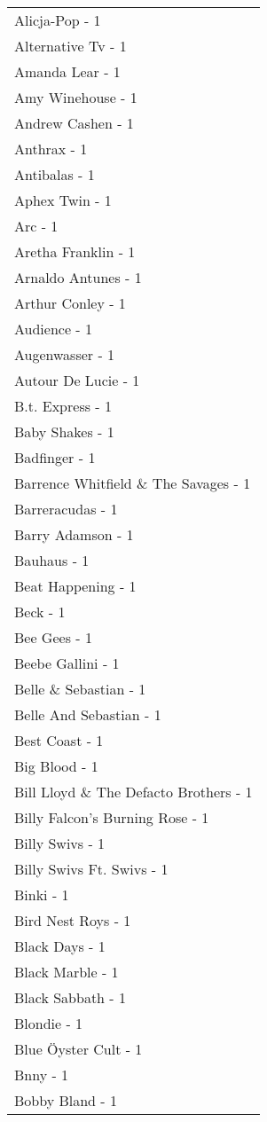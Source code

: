 \documentclass[
]{article}
\begin{document}
\begin{longtable}{l}
Alicja-Pop - 1 \\ 
Alternative Tv - 1 \\ 
Amanda Lear - 1 \\ 
Amy Winehouse - 1 \\ 
Andrew Cashen - 1 \\ 
Anthrax - 1 \\ 
Antibalas - 1 \\ 
Aphex Twin - 1 \\ 
Arc - 1 \\ 
Aretha Franklin - 1 \\ 
Arnaldo Antunes - 1 \\ 
Arthur Conley - 1 \\ 
Audience - 1 \\ 
Augenwasser - 1 \\ 
Autour De Lucie - 1 \\ 
B.t. Express - 1 \\ 
Baby Shakes - 1 \\ 
Badfinger - 1 \\ 
Barrence Whitfield \& The Savages - 1 \\ 
Barreracudas - 1 \\ 
Barry Adamson - 1 \\ 
Bauhaus - 1 \\ 
Beat Happening - 1 \\ 
Beck - 1 \\ 
Bee Gees - 1 \\ 
Beebe Gallini - 1 \\ 
Belle \& Sebastian - 1 \\ 
Belle And Sebastian - 1 \\ 
Best Coast - 1 \\ 
Big Blood - 1 \\ 
Bill Lloyd \& The Defacto Brothers - 1 \\ 
Billy Falcon's Burning Rose - 1 \\ 
Billy Swivs - 1 \\ 
Billy Swivs Ft. Swivs - 1 \\ 
Binki - 1 \\ 
Bird Nest Roys - 1 \\ 
Black Days - 1 \\ 
Black Marble - 1 \\ 
Black Sabbath - 1 \\ 
Blondie - 1 \\ 
Blue Öyster Cult - 1 \\ 
Bnny - 1 \\ 
Bobby Bland - 1 \\ 

\end{longtable}
\end{document}
